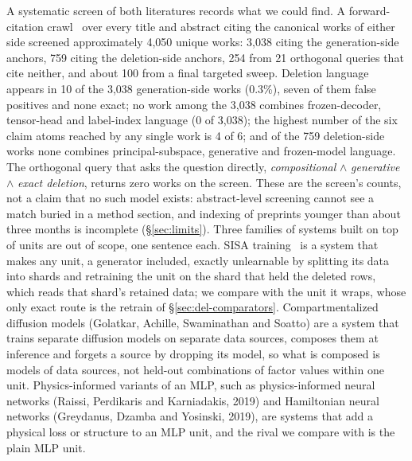 \documentclass{article} %
\begin{document}
A systematic screen of both literatures records what we could find. A forward-citation
crawl~\citep{priem2022openalex} over every title and abstract citing the canonical works of either side screened
approximately 4,050 unique works: 3,038 citing the generation-side anchors, 759 citing the
deletion-side anchors, 254 from 21 orthogonal queries that cite neither, and about 100 from
a final targeted sweep. %
Deletion language appears in 10 of the 3,038 generation-side works (0.3\%), seven of them
false positives and none exact; no work among the 3,038 combines frozen-decoder,
tensor-head and label-index language (0 of 3,038); the highest number of the six claim
atoms reached by any single work is 4 of 6; and of the 759 deletion-side works none combines
principal-subspace, generative and frozen-model language. %
The orthogonal query that asks the question directly, \emph{compositional} $\wedge$
\emph{generative} $\wedge$ \emph{exact deletion}, returns zero works on the screen.
These are the screen's counts, not a claim that no such model exists: abstract-level screening
cannot see a match buried in a method section, and indexing of preprints younger than about
three months is incomplete (\S\ref{sec:limits}).
Three families of systems built on top of units are out of scope, one sentence each.
SISA training~\citep{bourtoule2021machine} is a system that makes any unit, a generator included,
exactly unlearnable by splitting its data into shards and retraining the unit on the shard that
held the deleted rows, which reads that shard's retained data; we compare with the unit it wraps,
whose only exact route is the retrain of \S\ref{sec:del-comparators}.
Compartmentalized diffusion models (Golatkar, Achille, Swaminathan and Soatto\nocite{golatkar2023training}) are a system that
trains separate diffusion models on separate data sources, composes them at inference and forgets
a source by dropping its model, so what is composed is models of data sources, not held-out
combinations of factor values within one unit.
Physics-informed variants of an MLP, such as physics-informed neural networks (Raissi, Perdikaris
and Karniadakis, 2019\nocite{raissi2019physics}) and Hamiltonian neural networks (Greydanus, Dzamba and Yosinski, 2019\nocite{greydanus2019hamiltonian}), are
systems that add a physical loss or structure to an MLP unit, and the rival we compare with is the
plain MLP unit.
\end{document}
